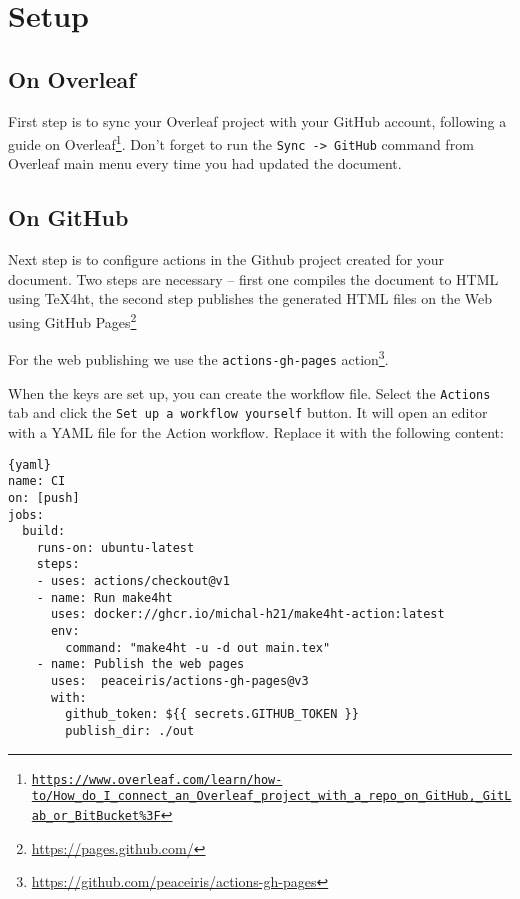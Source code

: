 \documentclass{article}
\newcommand{\cmdname}[1]{\texttt{#1}}
\newcommand\footurl[1]{\footnote{\url{#1}}}
\newcommand\urllink[2]{#1\footurl{#2}}
\newcommand\foothref[3]{#1\footnote{\href{#2}{#3}}}
\begin{document}
\section{Setup}

\subsection{On Overleaf}

First step is to sync your Overleaf project with your GitHub account, following \foothref{a guide on 
  Overleaf}{https://www.overleaf.com/learn/how-to/How_do_I_connect_an_Overleaf_project_with_a_repo_on_GitHub,_GitLab_or_BitBucket\%3F}
{\texttt{https://www.overleaf.com/learn/how-to/How\_do\_I\_connect\_an\_Overleaf\_project\_with\_a\allowbreak\_repo\_on\_GitHub,\_GitLab\_or\_BitBucket\%3F}}. 
Don't forget to run the \cmdname{Sync -> GitHub} command from Overleaf main menu every time you had updated the document.

\subsection{On GitHub}
Next step is to configure actions in the Github project created for your
document. Two steps are necessary -- first  one compiles the document to HTML
using \TeX4ht, the second step publishes the generated HTML files on the Web
using \urllink{GitHub Pages}{https://pages.github.com/}

For the web publishing we  use the \verb|actions-gh-pages|
\urllink{action}{https://github.com/peaceiris/actions-gh-pages}. 

When the keys are set up, you can create the workflow file. Select the
\cmdname{Actions} tab and click the \cmdname{Set up a workflow yourself}
button. It will open an editor with a YAML file for the Action workflow.
Replace it with the following content:


\begin{lstlisting}{yaml}
name: CI
on: [push]
jobs:
  build:
    runs-on: ubuntu-latest
    steps:
    - uses: actions/checkout@v1
    - name: Run make4ht
      uses: docker://ghcr.io/michal-h21/make4ht-action:latest
      env:
        command: "make4ht -u -d out main.tex"
    - name: Publish the web pages
      uses:  peaceiris/actions-gh-pages@v3
      with:
        github_token: ${{ secrets.GITHUB_TOKEN }}
        publish_dir: ./out
\end{lstlisting}
\end{document}
